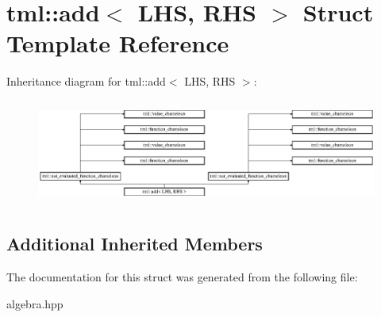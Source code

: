 \hypertarget{structtml_1_1add}{\section{tml\+:\+:add$<$ L\+H\+S, R\+H\+S $>$ Struct Template Reference}
\label{structtml_1_1add}
}
Inheritance diagram for tml\+:\+:add$<$ L\+H\+S, R\+H\+S $>$\+:\begin{figure}[H]
\begin{center}
\leavevmode
\includegraphics[height=3.500000cm]{structtml_1_1add}
\end{center}
\end{figure}
\subsection*{Additional Inherited Members}


The documentation for this struct was generated from the following file\+:\begin{DoxyCompactItemize}
\item 
algebra.\+hpp\end{DoxyCompactItemize}
